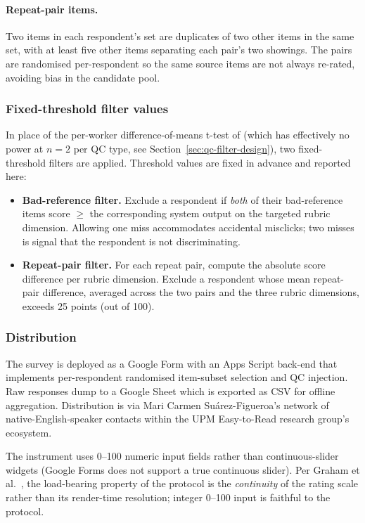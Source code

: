 \paragraph{Repeat-pair items.} Two items in each respondent's set are duplicates of two other items in the same set, with at least five other items separating each pair's two showings. The pairs are randomised per-respondent so the same source items are not always re-rated, avoiding bias in the candidate pool.

\subsubsection{Fixed-threshold filter values}

In place of the per-worker difference-of-means t-test of \cite{Graham2017} (which has effectively no power at $n = 2$ per QC type, see Section~\ref{sec:qc-filter-design}), two fixed-threshold filters are applied. Threshold values are fixed in advance and reported here:

\begin{itemize}
    \item \textbf{Bad-reference filter.} Exclude a respondent if \textit{both} of their bad-reference items score $\geq$ the corresponding system output on the targeted rubric dimension. Allowing one miss accommodates accidental misclicks; two misses is signal that the respondent is not discriminating.
    \item \textbf{Repeat-pair filter.} For each repeat pair, compute the absolute score difference per rubric dimension. Exclude a respondent whose mean repeat-pair difference, averaged across the two pairs and the three rubric dimensions, exceeds 25 points (out of 100).
\end{itemize}

\subsubsection{Distribution}

The survey is deployed as a Google Form with an Apps Script back-end that implements per-respondent randomised item-subset selection and QC injection. Raw responses dump to a Google Sheet which is exported as CSV for offline aggregation. Distribution is via Mari Carmen Su\'arez-Figueroa's network of native-English-speaker contacts within the UPM Easy-to-Read research group's ecosystem.

The instrument uses 0--100 numeric input fields rather than continuous-slider widgets (Google Forms does not support a true continuous slider). Per Graham et al.\ \cite{Graham2013}, the load-bearing property of the protocol is the \textit{continuity} of the rating scale rather than its render-time resolution; integer 0--100 input is faithful to the protocol.

